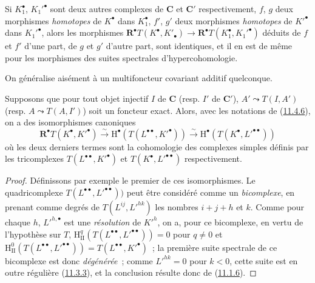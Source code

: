 \begin{env}[11.4.6]
Si $K_1^\bullet$, $K_1'^\bullet$ sont deux autres complexes de $\boldsymbol{C}$ et
$\boldsymbol{C}'$ respectivement, $f$, $g$ deux morphismes \emph{homotopes} de
$K^\bullet$ dans $K_1^\bullet$, $f'$, $g'$ deux morphismes \emph{homotopes} de
$K'^\bullet$ dans $K_1'^\bullet$, alors les morphismes
$\mathbf R^\bullet T(K^\bullet,K'_\bullet)\to
\mathbf R^\bullet T(K_1^\bullet,K_1'^\bullet)$ déduits de $f$ et $f'$ d'une
part, de $g$ et $g'$ d'autre part, sont identiques, et il en est de même pour
les morphismes des suites spectrales d'hypercohomologie.

On généralise aisément à un multifoncteur covariant additif quelconque.
\end{env}

\begin{proposition}[11.4.7]
\label{0.11.4.7-fr}
Supposons que pour tout objet injectif $I$ de $\boldsymbol{C}$ \textup{(resp.} $I'$ de
$\boldsymbol{C}'$), $A'\leadsto T(I,A')$ \textup{(resp.} $A\leadsto T(A,I')$) soit un
foncteur exact. Alors, avec les notations de
\textup{(\hyperref[0.11.4.6-fr]{11.4.6})}, on a des isomorphismes canoniques
\[
  \label{0.11.4.7.1-fr}
  \mathbf R^\bullet T(K^\bullet,K'^\bullet)
  \xrightarrow{\sim}\mathrm H^\bullet(T(L^{\bullet\bullet},K'^\bullet))
  \xrightarrow{\sim}\mathrm H^\bullet(T(K^\bullet,L'^{\bullet\bullet}))
  \tag{11.4.7.1}
\]
où les deux derniers termes sont la cohomologie des complexes simples définis
par les tricomplexes $T(L^{\bullet\bullet},K'^\bullet)$ et
$T(K^\bullet,L'^{\bullet\bullet})$ respectivement.
\end{proposition}

\begin{proof}
Définissons par exemple le premier de ces isomorphismes. Le quadricomplexe
$T(L^{\bullet\bullet},L'^{\bullet\bullet}))$ peut être considéré comme un
\emph{bicomplexe}, en prenant comme degrés de $T(L^{ij},L'^{hk})$ les nombres
$i+j+h$ et $k$. Comme pour chaque $h$, $L'^{h,\bullet}$ est une
\emph{résolution} de $K'^h$, on a, pour ce bicomplexe, en vertu de l'hypothèse
sur $T$,
$\mathrm H_{\mathrm{II}}^q(T(L^{\bullet\bullet},L'^{\bullet\bullet}))=0$
pour $q\neq0$ et
$\mathrm H_{\mathrm{II}}^0(T(L^{\bullet\bullet},L'^{\bullet\bullet}))
=T(L^{\bullet\bullet},K'^\bullet)$~; la première suite spectrale de ce
bicomplexe est donc \emph{dégénérée}~; comme $L'^{hk}=0$ pour $k<0$, cette
suite est en outre régulière (\hyperref[0.11.3.3-fr]{11.3.3}), et la
conclusion résulte donc de (\hyperref[0.11.1.6-fr]{11.1.6}).
\end{proof}

